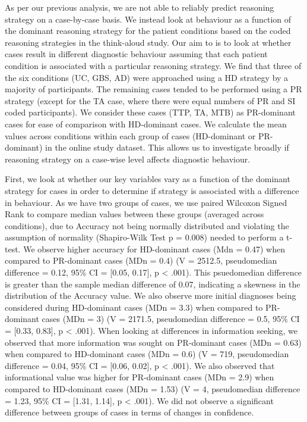 \documentclass[a4paper, nobind]{templates/ociamthesis}
\begin{document}
As per our previous analysis, we are not able to reliably predict reasoning strategy on a case-by-case basis. We instead look at behaviour as a function of the dominant reasoning strategy for the patient conditions based on the coded reasoning strategies in the think-aloud study. Our aim to is to look at whether cases result in different diagnostic behaviour assuming that each patient condition is associated with a particular reasoning strategy. We find that three of the six conditions (UC, GBS, AD) were approached using a HD strategy by a majority of participants. The remaining cases tended to be performed using a PR strategy (except for the TA case, where there were equal numbers of PR and SI coded participants). We consider these cases (TTP, TA, MTB) as PR-dominant cases for ease of comparison with HD-dominant cases. We calculate the mean values across conditions within each group of cases (HD-dominant or PR-dominant) in the online study dataset. This allows us to investigate broadly if reasoning strategy on a case-wise level affects diagnostic behaviour.

\hfill\break
First, we look at whether our key variables vary as a function of the dominant strategy for cases in order to determine if strategy is associated with a difference in behaviour. As we have two groups of cases, we use paired Wilcoxon Signed Rank to compare median values between these groups (averaged across conditions), due to Accuracy not being normally distributed and violating the assumption of normality (Shapiro-Wilk Test p = 0.008) needed to perform a t-test. We observe higher accuracy for HD-dominant cases (Mdn = 0.47) when compared to PR-dominant cases (MDn = 0.4) (V = 2512.5, pseudomedian difference = 0.12, 95\% CI = {[}0.05, 0.17{]}, p \textless{} .001). This psuedomedian difference is greater than the sample median difference of 0.07, indicating a skewness in the distribution of the Accuracy value. We also observe more initial diagnoses being considered during HD-dominant cases (MDn = 3.3) when compared to PR-dominant cases (MDn = 3) (V = 2171.5, pseudomedian difference = 0.5, 95\% CI = {[}0.33, 0.83{]}, p \textless{} .001). When looking at differences in information seeking, we observed that more information was sought on PR-dominant cases (MDn = 0.63) when compared to HD-dominant cases (MDn = 0.6) (V = 719, pseudomedian difference = 0.04, 95\% CI = {[}0.06, 0.02{]}, p \textless{} .001). We also observed that informational value was higher for PR-dominant cases (MDn = 2.9) when compared to HD-dominant cases (MDn = 1.53) (V = 4, pseudomedian difference = 1.23, 95\% CI = {[}1.31, 1.14{]}, p \textless{} .001). We did not observe a significant difference between groups of cases in terms of changes in confidence.
\end{document}
